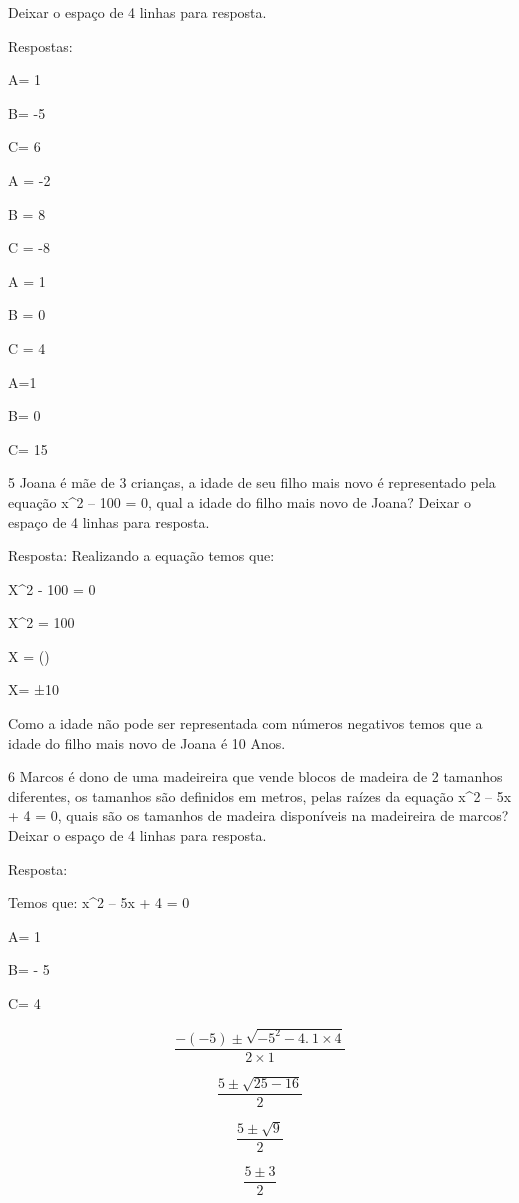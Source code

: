Deixar o espaço de 4 linhas para resposta.

Respostas:

\item 

A= 1

B= -5

C= 6

\item 

A = -2

B = 8

C = -8

\item 

A = 1

B = 0

C = 4

\item 

A=1

B= 0

C= 15

\num{5} Joana é mãe de 3 crianças, a idade de seu filho mais novo é
representado pela equação x^2 -- 100 = 0, qual a idade do filho mais novo
de Joana? Deixar o espaço de 4 linhas para resposta.

Resposta: Realizando a equação temos que:

X^2 - 100 = 0

X^2 = 100

X = ()

X= ±10

Como a idade não pode ser representada com números negativos temos que a
idade do filho mais novo de Joana é 10 Anos.

\num{6} Marcos é dono de uma madeireira que vende blocos de madeira de 2
tamanhos diferentes, os tamanhos são definidos em metros, pelas raízes
da equação x^2 -- 5x + 4 = 0, quais são os tamanhos de madeira
disponíveis na madeireira de marcos? Deixar o espaço de 4 linhas para
resposta.

Resposta:

Temos que: x^2 -- 5x + 4 = 0

A= 1

B= - 5

C= 4

\[\frac{- ( - 5) \pm \sqrt{{- 5}^{2} - 4.\ 1\times 4}}{2\times 1}\]

\[\frac{5 \pm \sqrt{25 - 16}}{2}\]

\[\frac{5 \pm \sqrt{9}}{2}\]

\[\frac{5 \pm 3}{2}\]

